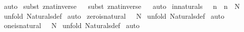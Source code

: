 \begin{isabellebody}
%
\isadelimproof
%
\endisadelimproof
%
\isatagproof
{}\isamarkupfalse%
\ auto\isanewline
{}\isamarkupfalse%
\ {\isacharparenleft}subst\ znat{\isacharunderscore}inverse{\isacharparenright}\isanewline
{}\isamarkupfalse%
\ {}\isanewline
{}\isamarkupfalse%
\ {\isacharparenleft}subst\ znat{\isacharunderscore}inverse{\isacharparenright}\isanewline
{}\isamarkupfalse%
\ \isamarkupfalse%
\isanewline
{}\isamarkupfalse%
\ auto\isanewline
{}\isamarkupfalse%
%
\endisatagproof
{\isafoldproof}%
%
\isadelimproof
\isanewline
%
\endisadelimproof
\isanewline
\isanewline
\isanewline
{}\isamarkupfalse%
\ in{\isacharunderscore}naturals{\isacharcolon}\ {\isachardoublequoteopen}{\isacharparenleft}{}\ {\isacharless}{\isacharequal}\ n{\isacharparenright}\ {\isacharequal}\ {\isacharparenleft}n\ {\isacharcolon}\ {\isacharpercent}N{\isacharparenright}{\isachardoublequoteclose}\isanewline
%
\isadelimproof
%
\endisadelimproof
%
\isatagproof
{}\isamarkupfalse%
\ {\isacharparenleft}unfold\ Naturals{\isacharunderscore}def{\isacharparenright}\isanewline
{}\isamarkupfalse%
\ auto\isanewline
{}\isamarkupfalse%
%
\endisatagproof
{\isafoldproof}%
%
\isadelimproof
\isanewline
%
\endisadelimproof
\isanewline
{}\isamarkupfalse%
\ zero{\isacharunderscore}is{\isacharunderscore}natural{\isacharcolon}\ {\isachardoublequoteopen}{}\ {\isacharcolon}\ {\isacharpercent}N{\isachardoublequoteclose}\isanewline
%
\isadelimproof
%
\endisadelimproof
%
\isatagproof
{}\isamarkupfalse%
\ {\isacharparenleft}unfold\ Naturals{\isacharunderscore}def{\isacharparenright}\isanewline
{}\isamarkupfalse%
\ auto\isanewline
{}\isamarkupfalse%
%
\endisatagproof
{\isafoldproof}%
%
\isadelimproof
\isanewline
%
\endisadelimproof
\isanewline
{}\isamarkupfalse%
\ one{\isacharunderscore}is{\isacharunderscore}natural{\isacharcolon}\ {\isachardoublequoteopen}{}\ {\isacharcolon}\ {\isacharpercent}N{\isachardoublequoteclose}\isanewline
%
\isadelimproof
%
\endisadelimproof
%
\isatagproof
{}\isamarkupfalse%
\ {\isacharparenleft}unfold\ Naturals{\isacharunderscore}def{\isacharparenright}\isanewline
{}\isamarkupfalse%
\ auto\isanewline
{}\isamarkupfalse%
%
\endisatagproof
{\isafoldproof}%
%
\isadelimproof
\isanewline
%
\endisadelimproof
\isanewline
{}\isamarkupfalse%

\end{isabellebody}

